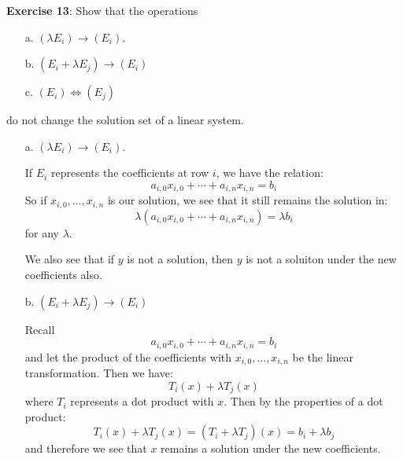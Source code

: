 \documentclass{article}
\begin{document}
\textbf{Exercise 13}: Show that the operations
    \begin{itemize}
        \item [a.] $(\lambda E_{i}) \rightarrow (E_{i})$.

        \item [b.] $(E_{i} + \lambda E_{j}) \rightarrow (E_{i})$

        \item [c.] $(E_{i}) \iff (E_{j})$
    \end{itemize}
do not change the solution set of a linear system.
    \begin{itemize}
        \item [a.] $(\lambda E_{i}) \rightarrow (E_{i})$.
            \begin{answer}
                If $E_{i}$ represents the coefficients at row $i$, we have the relation:
                    \begin{equation*}
                        a_{i, 0}x_{i, 0} + \cdots + a_{i, n}x_{i, n} = b_{i}
                    \end{equation*}
                So if $x_{i, 0}, \ldots, x_{i, n}$ is our solution, we see that it still remains the solution in:
                    \begin{equation*}
                        \lambda(a_{i, 0}x_{i, 0} + \cdots + a_{i, n}x_{i, n}) = \lambda b_{i}
                    \end{equation*}
                for any $\lambda$. 

                We also see that if $y$ is not a solution, then $y$ is not a soluiton under the new coefficients also.
            \end{answer}

        \item [b.] $(E_{i} + \lambda E_{j}) \rightarrow (E_{i})$
            \begin{answer}
                Recall
                    \begin{equation*}
                        a_{i, 0}x_{i, 0} + \cdots + a_{i, n}x_{i, n} = b_{i}
                    \end{equation*}
                and let the product of the coefficients with $x_{i, 0}, \ldots, x_{i, n}$ be the linear transformation. Then we have:
                    \begin{equation*}
                        T_{i}(x) + \lambda T_{j}(x)
                    \end{equation*}
                where $T_{i}$ represents a dot product with $x$. Then by the properties of a dot product:
                    \begin{equation*}
                        T_{i}(x) + \lambda T_{j}(x) = (T_{i} + \lambda T_{j})(x) = b_{i} + \lambda b_{j}
                    \end{equation*}
                and therefore we see that $x$ remains a solution under the new coefficients.


\end{answer}
\end{itemize}
\end{document}
